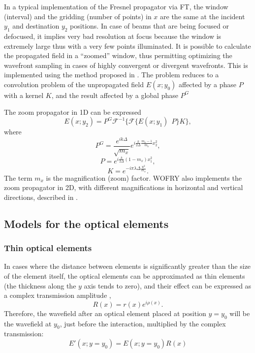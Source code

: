 \documentclass[preprint]{iucr}              %
\begin{document}
In a typical implementation of the Fresnel propagator via FT, the window (interval) and the gridding (number of points) in $x$ are the same at the incident $y_1$ and destination $y_2$ positions. In case of beams that are being focused or defocused, it implies very bad resolution at focus because the window is extremely large thus with a very few points illuminated. 
It is possible to calculate the propagated field in a ``zoomed'' window, thus permitting optimizing the wavefront sampling in cases of highly convergent or divergent wavefronts. This is implemented using the method proposed in \cite{schmidt}. The problem reduces to a convolution problem of the unpropagated field $E(x;y_0)$ affected by a phase $P$ with a kernel $K$, and the result affected by a global phase $P^G$

The zoom propagator in 1D can be expressed 
\begin{equation}
E(x; y_2) = P^G \mathcal{F}^{-1} \Big\{ \mathcal{F} \big\{ E(x;y_1)~~P \big\} K \Big\},
\end{equation}
where
\begin{equation}
P^G =  \frac { e^{ik\Delta }}{\sqrt{m_x} }e^{i \frac{k}{2 \Delta} \frac{m_x - 1}{m_x}x_2^2},
\end{equation}
\begin{equation}
P = e^{i \frac{k}{2\Delta} (1-m_x)x_1^2 },
\end{equation}
\begin{equation}
K = e^{-i \pi \lambda \Delta \frac{u^2}{m_x} }.
\end{equation}
The term $m_x$ is the magnification (zoom) factor. WOFRY also implements the zoom propagator in 2D, with different magnifications in horizontal and vertical directions, described in \cite{pirro}.



\subsection{Models for the optical elements}
\label{sec:elements}

\subsubsection{Thin optical elements}
\label{sec:thinelements}

In cases where the distance between elements is significantly greater than the size of the element itself, the optical elements can be approximated as thin elements (the thickness along the $y$ axis tends to zero), and their effect can be expressed as a complex transmission amplitude \cite{paganin},
\begin{equation}
    \label{eq:thinelement}
    R(x)=r(x) e^{i \rho(x)}.
\end{equation}
Therefore, the wavefield after an optical element placed at position $y=y_0$ will be the wavefield at $y_0$, just before the interaction, multiplied by the complex transmission:
\begin{equation}
    E'(x;y=y_0) = E(x;y=y_0) R(x)
\end{equation}
\end{document}
